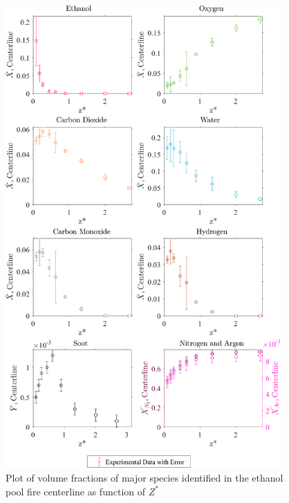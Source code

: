 \documentclass[12pt]{article}
\begin{document}
\begin{figure}[!h]
	\centering
\includegraphics[width=10.5cm,keepaspectratio]{Ethanol_MOL_FRAC_Plot.png}
	\caption[Plot of volume fractions, with error, of major species identified in the ethanol pool fire centerline as function of $Z^{*}$]{Plot of volume fractions of major species identified in the ethanol pool fire centerline as function of $Z^{*}$}
	\label{fig:Methanol_VOL_Frac_Major}
\end{figure}
\pagebreak
\end{document}
